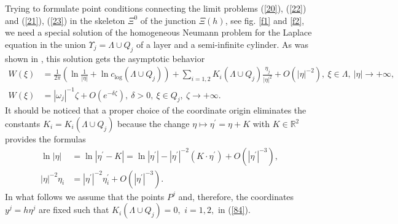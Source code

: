 \documentclass[11pt]{article}%
\numberwithin{equation}{section}
\begin{document}
Trying to formulate point conditions connecting the limit problems (\ref{20}),
(\ref{22}) and (\ref{21}), (\ref{23}) in the skeleton $\Xi^{0}$ of the
junction $\Xi(h)$, see fig. \ref{f1} and \ref{f2}, we need a special solution
of the homogeneous Neumann problem for the Laplace equation in the union
$\Upsilon_{j}=\Lambda\cup Q_{j}$ of a layer and a semi-infinite cylinder. As
was shown in \cite{BuCaNa1}, this solution gets the asymptotic behavior%
\begin{align}
W(\xi)  &  =\frac{1}{2\pi}\left(  \ln\frac{1}{|\eta|}+\ln c_{\log}(\Lambda\cup
Q_{j})\right)  +\sum\limits_{i=1,2}K_{i}(\Lambda\cup Q_{j})\frac{\eta_{j}%
}{|\eta|^{2}}+O(|\eta|^{-2}),\ \xi\in\Lambda,\ |\eta|\rightarrow
+\infty,\label{84}\\
W(\xi)  &  =|\omega_{j}|^{-1}\zeta+O(e^{-\delta\zeta}),\ \delta>0,\ \xi\in
Q_{j},\ \zeta\rightarrow+\infty. \label{85}%
\end{align}
It should be noticed that a proper choice of the coordinate origin eliminates
the constants $K_{i}=K_{i}(\Lambda\cup Q_{j})$ because the change $\eta
\mapsto\eta^{\prime}=\eta+K$ with $K\in\mathbb{R}^{2}$ provides the formulas%
\begin{align*}
\ln|\eta|  &  =\ln|\eta^{\prime}-K|=\ln|\eta^{\prime}|-|\eta^{\prime}%
|^{-2}(K\cdot\eta^{\prime})+O(|\eta^{\prime}|^{-3}),\\
|\eta|^{-2}\eta_{i}  &  =|\eta^{\prime}|^{-2}\eta_{i}^{\prime}+O(|\eta
^{\prime}|^{-3}).
\end{align*}
In what follows we assume that the points $P^{j}$ and, therefore, the
coordinates $y^{j}=h\eta^{j}$ are fixed such that $K_{i}(\Lambda\cup
Q_{j})=0,$ $i=1,2,$ in (\ref{84}).
\end{document}
